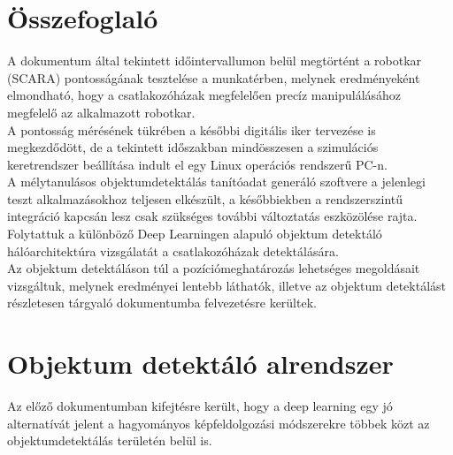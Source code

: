 \documentclass{article}
\begin{document}
\section{Összefoglaló}
A dokumentum által tekintett időintervallumon belül megtörtént a robotkar (SCARA)
pontosságának tesztelése a munkatérben, melynek eredményeként elmondható, hogy 
a csatlakozóházak megfelelően precíz manipulálásához megfelelő az alkalmazott robotkar.\\[5pt]
A pontosság mérésének tükrében a későbbi digitális iker tervezése is megkezdődött, de 
a tekintett időszakban mindösszesen a szimulációs keretrendszer beállítása indult el 
egy Linux operációs rendszerű PC-n.\\[5pt]
A mélytanulásos objektumdetektálás tanítóadat generáló szoftvere a jelenlegi teszt 
alkalmazásokhoz teljesen elkészült, a későbbiekben a rendszerszintű integráció 
kapcsán lesz csak szükséges további változtatás eszközölése rajta.\\[5pt]
Folytattuk a különböző Deep Learningen alapuló objektum detektáló hálóarchitektúra 
vizsgálatát a csatlakozóházak detektálására.\\[5pt]
Az objektum detektáláson túl a pozíciómeghatározás lehetséges megoldásait vizsgáltuk,
melynek eredményei lentebb láthatók, illetve az objektum detektálást részletesen tárgyaló
dokumentumba felvezetésre kerültek.


\section{Objektum detektáló alrendszer}
Az előző dokumentumban kifejtésre került, hogy a deep learning egy jó alternatívát jelent a hagyományos képfeldolgozási 
módszerekre többek közt az objektumdetektálás területén belül is. 
\end{document}
